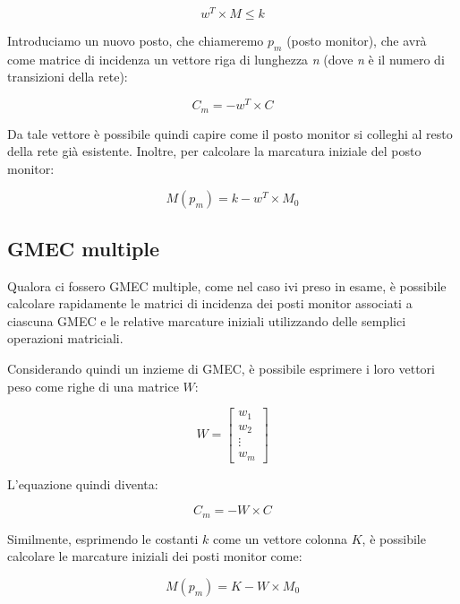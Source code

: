 \begin{equation}
    w^{T} \times M \leq k
\end{equation}

Introduciamo un nuovo posto, che chiameremo $p_{m}$ (posto monitor), che avrà come matrice di incidenza un vettore riga  di lunghezza \textit{n} (dove \textit{n} è il numero di transizioni della rete):

\begin{equation}
    C_{m} = -w^{T} \times C
\end{equation}

Da tale vettore è possibile quindi capire come il posto monitor si colleghi al resto della rete già esistente. Inoltre, per calcolare la marcatura iniziale del posto monitor:

\begin{equation}
    M(p_{m}) = k - w^{T} \times M_{0}
\end{equation}

\subsection{GMEC multiple}
Qualora ci fossero GMEC multiple, come nel caso ivi preso in esame, è possibile calcolare rapidamente le matrici di incidenza dei posti monitor associati a ciascuna GMEC e le relative marcature iniziali utilizzando delle semplici operazioni matriciali.

Considerando quindi un inzieme di GMEC, è possibile esprimere i loro vettori peso come righe di una matrice $W$:

\begin{equation}
    W = \begin{bmatrix}
        w_{1} \\
        w_{2} \\
        \vdots \\
        w_{m}
    \end{bmatrix}
\end{equation}

L'equazione quindi diventa:

\begin{equation}
    C_{m} = -W \times C
\end{equation}

Similmente, esprimendo le costanti $k$ come un vettore colonna $K$, è possibile calcolare le marcature iniziali dei posti monitor come:

\begin{equation}
    M(p_{m}) = K - W \times M_{0}
\end{equation}